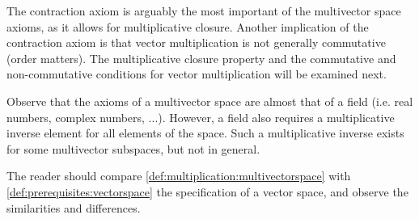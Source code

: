 
The contraction axiom is arguably the most important of the multivector space axioms, as it allows for multiplicative closure.  Another implication of the contraction axiom is that vector multiplication is not generally commutative (order matters).
The multiplicative closure property and the commutative and non-commutative conditions for vector multiplication will be examined next.

Observe that the axioms of a multivector space are almost that of a field (i.e. real numbers, complex numbers, ...).
However,
a field also requires a multiplicative inverse element for all elements of the space.
Such a multiplicative inverse exists for some multivector subspaces, but not in general.

The reader should compare \cref{def:multiplication:multivectorspace} with
\cref{def:prerequisites:vectorspace} the specification of a vector space, and observe the similarities and differences.

